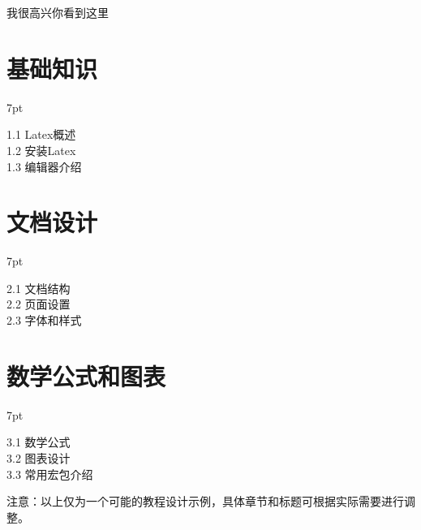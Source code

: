 \documentclass{article}
\newenvironment{formal}{%
\def\FrameCommand{%
\hspace{1pt}%
{\color{DarkBlue}\vrule width 2pt}%
{\color{formalshade}\vrule width 4pt}%
\colorbox{formalshade}%
}%
\MakeFramed{\advance\hsize-\width\FrameRestore}%
\noindent\hspace{-4.55pt}%
\begin{adjustwidth}{}{7pt}%
\vspace{2pt}\vspace{2pt}%
}
{%
\vspace{2pt}\end{adjustwidth}\endMakeFramed%
}
\begin{document}
我很高兴你看到这里

\section{基础知识}
\begin{formal}
1.1 Latex概述\\
1.2 安装Latex\\
1.3 编辑器介绍
\end{formal}



\section{文档设计}
\begin{formal}
2.1 文档结构\\
2.2 页面设置\\
2.3 字体和样式
\end{formal}



\section{数学公式和图表}
\begin{formal}
3.1 数学公式\\
3.2 图表设计\\
3.3 常用宏包介绍
\end{formal}


注意：以上仅为一个可能的教程设计示例，具体章节和标题可根据实际需要进行调整。
\end{document}
